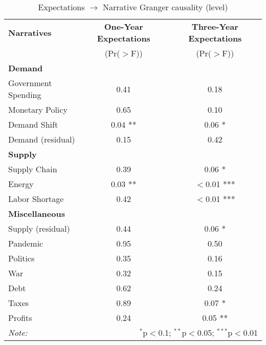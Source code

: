 \begin{table}[ht]
\centering
\caption{Expectations $\rightarrow$ Narrative Granger causality (level)}\label{tab:granger}

\begin{tabular}{lcc}
\toprule
\textbf{Narratives} & \textbf{One-Year Expectations} & \textbf{Three-Year Expectations} \\
& (Pr($>$F)) & (Pr($>$F)) \\
\midrule
\multicolumn{3}{l}{\textbf{Demand}} \\
\midrule
Government Spending & 0.41 & 0.18 \\
Monetary Policy & 0.65 & 0.10 \\
Demand Shift & 0.04 ** & 0.06 * \\
Demand (residual) & 0.15 & 0.42 \\
\midrule
\multicolumn{3}{l}{\textbf{Supply}} \\
\midrule
Supply Chain & 0.39 & 0.06 * \\
Energy & 0.03 ** & $<$0.01 *** \\
Labor Shortage & 0.42 & $<$0.01 *** \\
\midrule
\multicolumn{3}{l}{\textbf{Miscellaneous}} \\
\midrule
Supply (residual) & 0.44 & 0.06 * \\
Pandemic & 0.95 & 0.50 \\
Politics & 0.35 & 0.16 \\
War & 0.32 & 0.15 \\
Debt & 0.62 & 0.24 \\
Taxes & 0.89 & 0.07 * \\
Profits & 0.24 & 0.05 ** \\
\midrule
\bottomrule
\textit{Note:}  & \multicolumn{2}{r}{$^{*}$p$<$0.1; $^{**}$p$<$0.05; $^{***}$p$<$0.01} \\
\bottomrule
\end{tabular}
\end{table}
